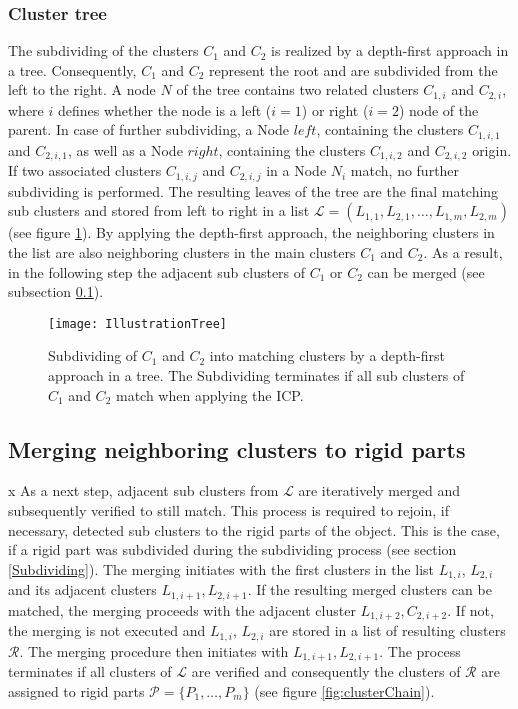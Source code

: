 \subsubsection{Cluster tree}
\label{tree}

The subdividing of the clusters $C_1$ and $C_2$ is realized by a depth-first approach in a tree. Consequently, $C_1$ and $C_2$ represent the root and are subdivided from the left to the right. A node $N$ of the tree contains two related clusters $C_{1,i}$ and $C_{2,i}$, where $i$ defines whether the node is a left ($i=1$) or right ($i=2$) node of the parent. In case of further subdividing, a Node $\mathit{left}$, containing the  clusters $C_{1,i,1}$ and $C_{2,i,1}$, as well as a Node $\mathit{right}$, containing the clusters $C_{1,i,2}$ and $C_{2,i,2}$ origin. If two associated clusters $C_{1,i,j}$ and $C_{2,i,j}$ in a Node $N_i$ match, no further subdividing is performed. The resulting leaves of the tree are the final matching sub clusters and stored from left to right in a list $\mathcal{L} = (L_{1,1},L_{2,1},\ldots,L_{1,m},L_{2,m})$ (see figure \ref{fig:illustrationTree}). By applying the depth-first approach, the neighboring clusters in the list are also neighboring clusters in the main clusters $C_1$ and $C_2$.  As a result, in the following step the adjacent sub clusters of $C_1$ or $C_2$ can be merged (see subsection \ref{mergingClusters}).
\begin{figure}
	\centering
	\texttt{[image: IllustrationTree]}
	\caption{Subdividing of $C_1$ and $C_2$ into matching clusters by a depth-first approach in a tree. The Subdividing terminates if all sub clusters of $C_1$ and $C_2$ match when applying the ICP.}
	\label{fig:illustrationTree}
\end{figure}

\subsection{Merging neighboring clusters to rigid parts}
\label{mergingClusters}x
As a next step, adjacent sub clusters from $\mathcal{L}$ are iteratively merged and subsequently verified to still match. This process is required to rejoin, if necessary, detected sub clusters to the rigid parts of the object. This is the case, if a rigid part was subdivided during the subdividing process (see section \ref{Subdividing}). The merging initiates with the first clusters in the list $L_{1,i}$, $L_{2,i}$ and its adjacent clusters $L_{1,i+1},L_{2,i+1}$. If the resulting merged clusters can be matched, the merging proceeds with the adjacent cluster $L_{1,i+2},C_{2,i+2}$. If not, the merging is not executed and $L_{1,i}$, $L_{2,i}$ are stored in a list of resulting clusters $\mathcal{R}$. The merging procedure then initiates with $L_{1,i+1},L_{2,i+1}$. The process terminates if all clusters of $\mathcal{L}$ are verified and consequently the clusters of $\mathcal{R}$ are assigned to rigid parts $\mathcal{P} =  \{P_1,\ldots,P_m\}$ (see figure \ref{fig:clusterChain}). 

